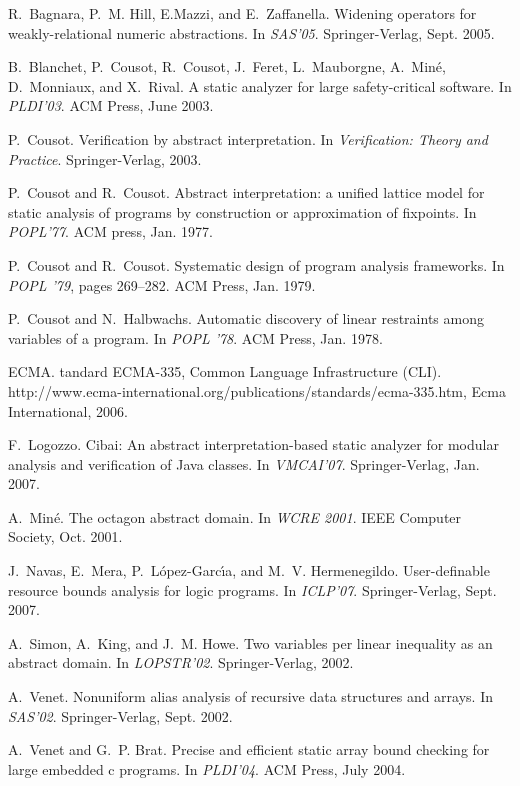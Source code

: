 \documentclass{sig-alternate}
\begin{document}
\begin{thebibliography}{10}
\small

R.~Bagnara, P.~M. Hill, E{.}Mazzi, and E.~Zaffanella.
\newblock Widening operators for weakly-relational numeric abstractions.
\newblock In {\em SAS'05}. Springer-Verlag, Sept. 2005.

B.~Blanchet, P.~Cousot, R.~Cousot, J.~Feret, L.~Mauborgne, A.~Min\'e,
  D.~Monniaux, and X.~Rival.
\newblock A static analyzer for large safety-critical software.
\newblock In {\em PLDI'03}. ACM Press, June 2003.

P.~Cousot.
\newblock Verification by abstract interpretation.
\newblock In {\em Verification: Theory and Practice}. Springer-Verlag, 2003.

P.~Cousot and R.~Cousot.
\newblock Abstract interpretation: a unified lattice model for static analysis
  of programs by construction or approximation of fixpoints.
\newblock In {\em POPL'77}. ACM press, Jan. 1977.

P.~Cousot and R.~Cousot.
\newblock Systematic design of program analysis frameworks.
\newblock In {\em POPL '79}, pages 269--282. ACM Press, Jan. 1979.

P.~Cousot and N.~Halbwachs.
\newblock Automatic discovery of linear restraints among variables of a
  program.
\newblock In {\em POPL '78}. ACM Press, Jan. 1978.

ECMA.
tandard {ECMA-335}, {C}ommon {L}anguage {I}nfrastructure ({CLI}).
\newblock
  http://www.ecma-international.org/\-publications/\-standards/\-ecma-335.htm,
  Ecma International, 2006.

F.~Logozzo.
\newblock Cibai: An abstract interpretation-based static analyzer for modular
  analysis and verification of {Java} classes.
\newblock In {\em VMCAI'07}. Springer-Verlag, Jan. 2007.

A.~Min\'e.
\newblock The octagon abstract domain.
\newblock In {\em WCRE 2001}. IEEE Computer Society, Oct. 2001.

J.~Navas, E.~Mera, P.~L{\'o}pez-Garc\'{\i}a, and M.~V. Hermenegildo.
\newblock User-definable resource bounds analysis for logic programs.
\newblock In {\em ICLP'07}. Springer-Verlag, Sept. 2007.

A.~Simon, A.~King, and J.~M. Howe.
\newblock Two variables per linear inequality as an abstract domain.
\newblock In {\em LOPSTR'02}. Springer-Verlag, 2002.

A.~Venet.
\newblock Nonuniform alias analysis of recursive data structures and arrays.
\newblock In {\em SAS'02}. Springer-Verlag, Sept. 2002.

A.~Venet and G.~P. Brat.
\newblock Precise and efficient static array bound checking for large embedded
  c programs.
\newblock In {\em PLDI'04}. ACM Press, July 2004.

\end{thebibliography}

%
% 
\end{document}
